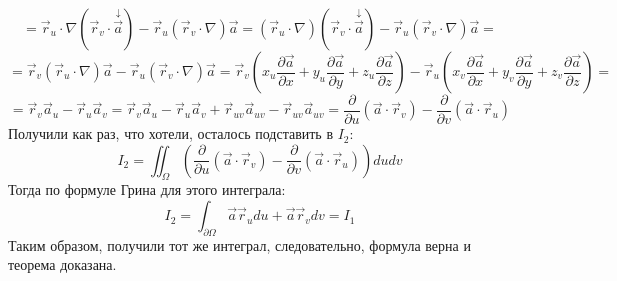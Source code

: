 \documentclass[12pt]{article}
\begin{document}
$$=\overrightarrow{r}_u \cdot \nabla (\overrightarrow{r}_v \cdot \overset{\downarrow}{\overrightarrow{a}}) - \overrightarrow{r}_u (\overrightarrow{r}_v \cdot \nabla) \overrightarrow{a} = (\overrightarrow{r}_u \cdot \nabla)(\overrightarrow{r}_v \cdot \overset{\downarrow}{\overrightarrow{a}}) - \overrightarrow{r}_u(\overrightarrow{r}_v \cdot \nabla) \overrightarrow{a}=$$
$$= \overrightarrow{r}_v (\overrightarrow{r}_u \cdot \nabla) \overrightarrow{a} - \overrightarrow{r}_u (\overrightarrow{r}_v \cdot \nabla) \overrightarrow{a} = \overrightarrow{r}_v (x_u \frac{\partial \overrightarrow{a}}{\partial x} + y_u \frac{\partial \overrightarrow{a}}{\partial y} + z_u \frac{\partial \overrightarrow{a}}{\partial z}) - \overrightarrow{r}_u (x_v \frac{\partial \overrightarrow{a}}{\partial x} + y_v \frac{\partial \overrightarrow{a}}{\partial y} + z_v \frac{\partial \overrightarrow{a}}{\partial z}) =$$
$$= \overrightarrow{r}_v \overrightarrow{a}_u - \overrightarrow{r}_u \overrightarrow{a}_v = \overrightarrow{r}_v \overrightarrow{a}_u - \overrightarrow{r}_u \overrightarrow{a}_v + \overrightarrow{r}_{uv} \overrightarrow{a}_{uv} - \overrightarrow{r}_{uv} \overrightarrow{a}_{uv} = \frac{\partial}{\partial u}(\overrightarrow{a} \cdot \overrightarrow{r}_v) - \frac{\partial}{\partial v} (\overrightarrow{a} \cdot \overrightarrow{r}_u)$$
Получили как раз, что хотели, осталось подставить в $I_2$:\\
$$I_2 = \iint_{\Omega} (\frac{\partial}{\partial u}(\overrightarrow{a} \cdot \overrightarrow{r}_v) - \frac{\partial}{\partial v} (\overrightarrow{a} \cdot \overrightarrow{r}_u)) du dv$$
Тогда по формуле Грина для этого интеграла:\\
$$I_2 = \int_{\partial \Omega} \overrightarrow{a} \overrightarrow{r}_u du + \overrightarrow{a} \overrightarrow{r}_v dv = I_1$$
Таким образом, получили тот же интеграл, следовательно, формула верна и теорема доказана.\\
\end{document}
